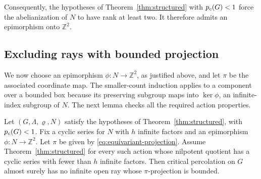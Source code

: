 Consequently, the hypotheses of Theorem~\ref{thm:structured} with
$p_c(G)<1$ force the abelianization of $N$ to have rank at least two.
It therefore admits an epimorphism onto $\mathbb Z^2$.

\subsection{Excluding rays with bounded projection}

We now choose an epimorphism \(\phi:N\to\mathbb Z^2\), as justified
above, and let \(\pi\) be the associated coordinate map. The smaller-count
induction applies to a component over a bounded box because its
preserving subgroup maps into \(\ker\phi\), an infinite-index subgroup
of \(N\). The next lemma checks all the required action properties.

\begin{lemma}
\label{lem:bounded-projection}
\label{lem:unbounded-projection}
Let $(G,\Lambda,\varrho,N)$ satisfy the hypotheses of
Theorem~\ref{thm:structured}, with $p_c(G)<1$. Fix a cyclic series for
$N$ with $h$ infinite factors and an epimorphism $\phi:N\to\mathbb Z^2$.
Let $\pi$ be given by \eqref{eq:equivariant-projection}. Assume
Theorem~\ref{thm:structured} for every such action whose nilpotent
quotient has a cyclic series with fewer than $h$ infinite factors.
Then critical percolation on $G$ almost surely has no infinite open ray
whose $\pi$-projection is bounded.
\end{lemma}

